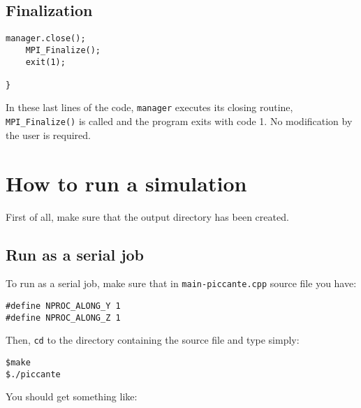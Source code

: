 \documentclass[11pt,a4paper]{report}
\begin{document}
\section{Finalization}
\begin{lstlisting}[backgroundcolor=\color{no_modify}]
	manager.close();
	MPI_Finalize();
	exit(1);

}
\end{lstlisting}
In these last lines of the code, \verb+manager+ executes its closing routine, \verb+MPI_Finalize()+ is called and the program exits with code 1. No modification by the user is required.



\chapter{How to run a simulation}\label{chapter_run}
First of all, make sure that the output directory has been created.
\section{Run as a serial job}
To run as a serial job, make sure that in \verb+main-piccante.cpp+ source file you have:
\begin{lstlisting}
#define NPROC_ALONG_Y 1
#define NPROC_ALONG_Z 1
\end{lstlisting}
Then, \verb+cd+ to the directory containing the source file and type simply:
\begin{verbatim}
$make
$./piccante
\end{verbatim}
You should get something like:
\end{document}

